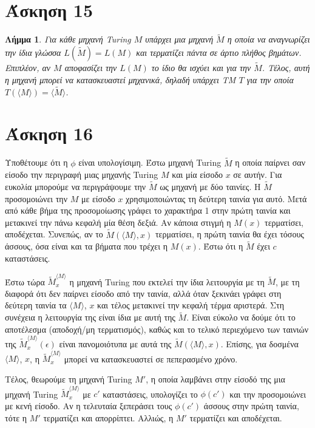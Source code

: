 \documentclass[a4paper, oneside, 11pt]{article}
\newtheorem{lm}[thm]{Λήμμα}
\theoremstyle{definition}
\begin{document}
\section*{Άσκηση 15}

\begin{lm}
Για κάθε μηχανή Turing $Μ$ υπάρχει μια μηχανή $\widetilde{M}$ η οποία να αναγνωρίζει
την ίδια γλώσσα $L(\widetilde{M}) = L(M)$ και τερματίζει πάντα σε άρτιο πλήθος
βημάτων. Επιπλέον, αν $M$ \emph{αποφασίζει} την $L(M)$ το ίδιο θα ισχύει και για την
$\widetilde{M}$. Τέλος, αυτή η μηχανή μπορεί να κατασκευαστεί μηχανικά, δηλαδή
υπάρχει TM $T$ για την οποία $T(\langle M \rangle) = \langle \widetilde{M} \rangle$.
\end{lm}

\section*{Άσκηση 16}

Υποθέτουμε ότι η $\phi$ είναι υπολογίσιμη.
Έστω μηχανή Turing $\widetilde{M}$ η οποία παίρνει σαν είσοδο την περιγραφή μιας μηχανής Turing $M$ και μία
είσοδο $x$ σε αυτήν. 
Για ευκολία μπορούμε να περιγράψουμε την $\widetilde{M}$ ως μηχανή με δύο ταινίες. 
Η $\widetilde{M}$ προσομοιώνει την $M$ με είσοδο $x$ χρησιμοποιώντας τη δεύτερη ταινία για αυτό. 
Μετά από κάθε βήμα της προσομοίωσης γράφει το χαρακτήρα 1 στην πρώτη ταινία και μετακινεί την πάνω κεφαλή 
μία θέση δεξιά. Αν κάποια στιγμή η $M(x)$ τερματίσει, αποδέχεται. Συνεπώς, αν το $\widetilde{M}(\langle M\rangle,x)$ 
τερματίσει, 
η πρώτη ταινία θα έχει τόσους άσσους, όσα είναι και τα βήματα που τρέχει η $M(x)$. Έστω ότι η $\widetilde{M}$
έχει $c$ καταστάσεις.

Έστω τώρα $\widetilde{M}_{x}^{\langle M\rangle}$ η μηχανή Turing που εκτελεί την ίδια λειτουργία
με τη $\widetilde{M}$, με τη διαφορά ότι δεν παίρνει είσοδο από την ταινία, αλλά όταν ξεκινάει γράφει στη δεύτερη
ταινία τα $\langle M\rangle$, $x$ και τέλος μετακινεί την κεφαλή τέρμα αριστερά. Στη συνέχεια
η λειτουργία της είναι ίδια με αυτή της $\widetilde{M}$.
Είναι εύκολο να δούμε ότι το αποτέλεσμα (αποδοχή/μη τερματισμός), καθώς και το τελικό 
περιεχόμενο των ταινιών της $\widetilde{M}_{x}^{\langle M\rangle}(\epsilon)$ είναι πανομοιότυπα με αυτά της 
$\widetilde{M}(\langle M\rangle, x)$. Επίσης, για δοσμένα $\langle M\rangle$, $x$, η
$\widetilde{M}_{x}^{\langle M\rangle}$
μπορεί να κατασκευαστεί σε πεπερασμένο χρόνο.

Τέλος, θεωρούμε τη μηχανή Turing $M'$, η οποία λαμβάνει στην είσοδό της μια μηχανή Turing 
$\widetilde{M}_x^{\langle M\rangle}$ με $c'$
καταστάσεις, υπολογίζει το $\phi(c')$ και την προσομοιώνει με κενή είσοδο. 
Αν η τελευταία ξεπεράσει τους
$\phi(c')$ άσσους στην πρώτη ταινία, τότε η $M'$ τερματίζει και απορρίπτει.
Αλλιώς, η $M'$ τερματίζει και αποδέχεται.
\end{document}
